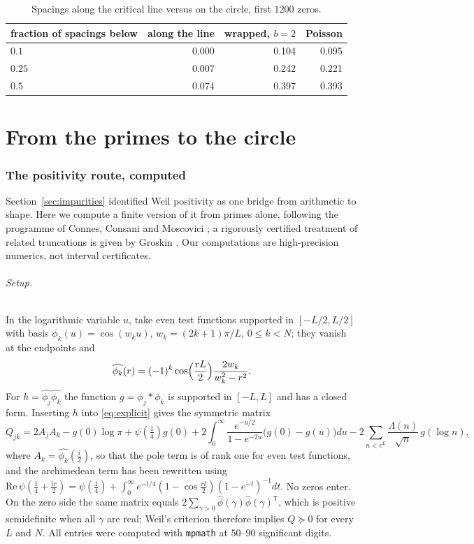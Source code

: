 \documentclass[11pt,a4paper]{article}
\theoremstyle{definition}\newtheorem{definition}[proposition]{Definition}
\theoremstyle{remark}\newtheorem{remark}[proposition]{Remark}
\begin{document}
\begin{table}[ht]
\centering\small
\begin{tabular}{lrrr}
\toprule
fraction of spacings below & along the line & wrapped, $b=2$ & Poisson\\
\midrule
$0.1$ & 0.000 & 0.104 & 0.095\\
$0.25$ & 0.007 & 0.242 & 0.221\\
$0.5$ & 0.074 & 0.397 & 0.393\\
\bottomrule
\end{tabular}
\caption{Spacings along the critical line versus on the circle, first $1200$ zeros.}\label{tab:wrap}
\end{table}

\part{From the primes to the circle}

\section{The positivity route, computed}\label{sec:weilform}
Section~\ref{sec:impurities} identified Weil positivity as one bridge from arithmetic to shape. Here we compute a finite version of it from primes alone, following the programme of Connes, Consani and Moscovici \cite{CCM2023,CCM2025}; a rigorously certified treatment of related truncations is given by Groskin \cite{Groskin2026}. Our computations are high-precision numerics, not interval certificates.

\paragraph{Setup.} In the logarithmic variable $u$, take even test functions supported in $[-L/2,L/2]$ with basis $\phi_k(u)=\cos(w_ku)$, $w_k=(2k+1)\pi/L$, $0\le k<N$; they vanish at the endpoints and
\[
\widehat{\phi_k}(r)=(-1)^k\cos\Bigl(\frac{rL}2\Bigr)\frac{2w_k}{w_k^2-r^2}.
\]
For $h=\widehat{\phi_j}\widehat{\phi_k}$ the function $g=\phi_j*\phi_k$ is supported in $[-L,L]$ and has a closed form. Inserting $h$ into \eqref{eq:explicit} gives the symmetric matrix
\[
Q_{jk}=2A_jA_k-g(0)\log\pi+\psi(\tfrac14)g(0)+2\int_0^\infty\frac{e^{-u/2}}{1-e^{-2u}}\bigl(g(0)-g(u)\bigr)du-2\sum_{n<e^{L}}\frac{\Lambda(n)}{\sqrt n}\,g(\log n),
\]
where $A_k=\widehat{\phi_k}(\tfrac i2)$, so that the pole term is of rank one for even test functions, and the archimedean term has been rewritten using $\mathrm{Re}\,\psi(\frac14+\frac{ir}2)=\psi(\frac14)+\int_0^\infty e^{-t/4}(1-\cos\frac{rt}2)(1-e^{-t})^{-1}dt$. No zeros enter. On the zero side the same matrix equals $2\sum_{\gamma>0}\widehat\phi(\gamma)\widehat\phi(\gamma)^{\mathsf T}$, which is positive semidefinite when all $\gamma$ are real; Weil's criterion therefore implies $Q\succeq0$ for every $L$ and $N$. All entries were computed with \texttt{mpmath} at $50$--$90$ significant digits.
\end{document}
